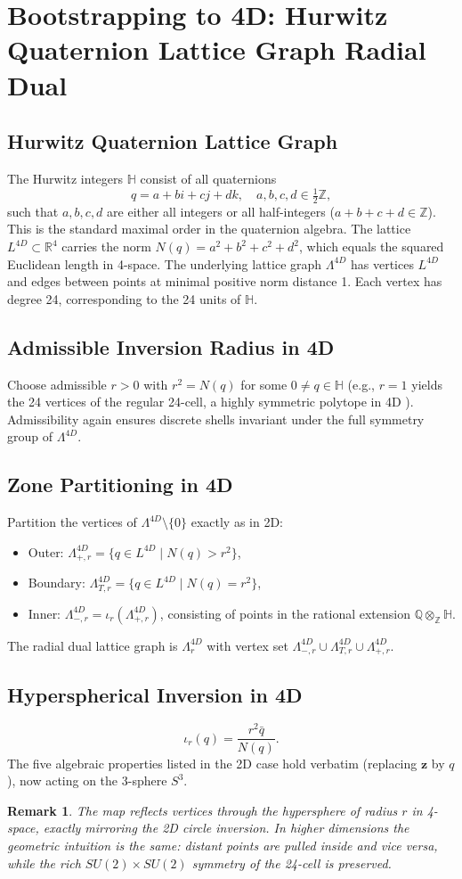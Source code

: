 \documentclass{article}
\newtheorem{remark}{Remark}
\begin{document}
\section{Bootstrapping to 4D: Hurwitz Quaternion Lattice Graph Radial Dual}
\subsection{Hurwitz Quaternion Lattice Graph}
The Hurwitz integers \(\mathbb{H}\) consist of all quaternions
\[
q = a + bi + cj + dk, \quad a,b,c,d \in \tfrac{1}{2}\mathbb{Z},
\]
such that \(a,b,c,d\) are either all integers or all half-integers (\(a+b+c+d \in \mathbb{Z}\)). This is the standard maximal order in the quaternion algebra.\cite{ConwaySmith2003} The lattice \(L^{4D} \subset \mathbb{R}^4\) carries the norm \(N(q) = a^2 + b^2 + c^2 + d^2\), which equals the squared Euclidean length in 4-space.
The underlying lattice graph \(\Lambda^{4D}\) has vertices \(L^{4D}\) and edges between points at minimal positive norm distance 1. Each vertex has degree 24, corresponding to the 24 units of \(\mathbb{H}\).
\subsection{Admissible Inversion Radius in 4D}
Choose admissible \(r > 0\) with \(r^2 = N(q)\) for some \(0 \neq q \in \mathbb{H}\) (e.g., \(r=1\) yields the 24 vertices of the regular 24-cell, a highly symmetric polytope in 4D \cite{Coxeter1973}). Admissibility again ensures discrete shells invariant under the full symmetry group of \(\Lambda^{4D}\).
\subsection{Zone Partitioning in 4D}
Partition the vertices of \(\Lambda^{4D} \setminus \{0\}\) exactly as in 2D:
\begin{itemize}
  \item Outer: \(\Lambda_{+,r}^{4D} = \{ q \in L^{4D} \mid N(q) > r^2 \}\),
  \item Boundary: \(\Lambda_{T,r}^{4D} = \{ q \in L^{4D} \mid N(q) = r^2 \}\),
  \item Inner: \(\Lambda_{-,r}^{4D} = \iota_r(\Lambda_{+,r}^{4D})\), consisting of points in the rational extension \(\mathbb{Q} \otimes_{\mathbb{Z}} \mathbb{H}\).
\end{itemize}
The radial dual lattice graph is \(\Lambda_r^{4D}\) with vertex set \(\Lambda_{-,r}^{4D} \cup \Lambda_{T,r}^{4D} \cup \Lambda_{+,r}^{4D}\).
\subsection{Hyperspherical Inversion in 4D}
\[
\iota_r(q) = \frac{r^2 \bar{q}}{N(q)}.
\]
The five algebraic properties listed in the 2D case hold verbatim (replacing \(\mathbf{z}\) by \(q\)), now acting on the 3-sphere \(S^3\).
\begin{remark}
The map reflects vertices through the hypersphere of radius \(r\) in 4-space, exactly mirroring the 2D circle inversion. In higher dimensions the geometric intuition is the same: distant points are pulled inside and vice versa, while the rich \(SU(2) \times SU(2)\) symmetry of the 24-cell is preserved.
\end{remark}
\end{document}
